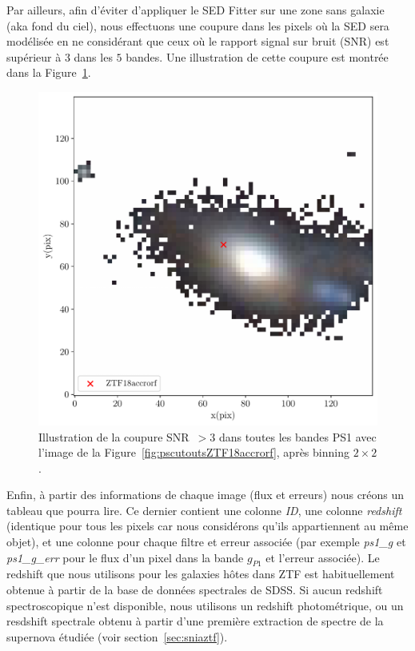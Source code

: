 \documentclass[../main/main.tex]{subfiles}
\begin{document}
Par ailleurs, afin d'éviter d'appliquer le SED Fitter sur une zone sans
galaxie (aka fond du ciel), nous effectuons une coupure dans les pixels
où la SED sera modélisée en ne considérant que ceux où le rapport signal
sur bruit (SNR) est supérieur à $3$ dans les $5$ bandes. Une
illustration de cette coupure est montrée dans la Figure~\ref{fig:pscutoutsZTF18accrorf_cutsnr}. 

\begin{figure}[ht]
  \begin{minipage}[c]{0.45\textwidth}
    \includegraphics[width=\textwidth]{../figures/05_sedfit/ps_cutouts_ZTF18accrorf_snrcut.pdf}
  \end{minipage}\hfill
  \begin{minipage}[c]{0.53\textwidth}
    \caption[Image RGB de PS1 avec coupure SNR]{Illustration de la
      coupure SNR~$>3$ dans toutes les bandes PS1 avec l'image de la
      Figure~\ref{fig:pscutoutsZTF18accrorf}, après binning $2\times2$.}\label{fig:pscutoutsZTF18accrorf_cutsnr}
  \end{minipage}
\end{figure}

Enfin, à partir des informations de chaque image (flux et
erreurs) nous créons un tableau que  pourra lire. Ce
dernier contient une colonne \textit{ID}, une colonne \textit{redshift}
(identique pour tous les pixels car nous considérons qu'ils appartiennent au même objet),
et une colonne pour chaque filtre et erreur associée (par exemple
\textit{ps1\_g} et \textit{ps1\_g\_err} pour le flux d'un pixel dans la bande
$g_{P1}$ et l'erreur associée). Le redshift que nous utilisons pour les
galaxies hôtes dans ZTF est habituellement obtenue à
partir de la base de données spectrales de SDSS. Si aucun redshift spectroscopique
n'est disponible, nous utilisons un redshift photométrique, ou un
resdshift spectrale obtenu à partir d'une première extraction de spectre
de la supernova étudiée (voir section~\ref{sec:sniaztf}).
\end{document}

